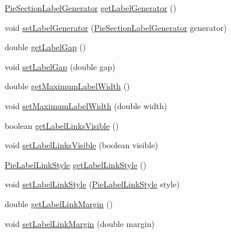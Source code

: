 \begin{DoxyCompactItemize}
\item 
\mbox{\hyperlink{interfaceorg_1_1jfree_1_1chart_1_1labels_1_1_pie_section_label_generator}{Pie\+Section\+Label\+Generator}} \mbox{\hyperlink{classorg_1_1jfree_1_1chart_1_1plot_1_1_pie_plot_a4468c4b622678866bd5fc13c1c2bca50}{get\+Label\+Generator}} ()
\item 
void \mbox{\hyperlink{classorg_1_1jfree_1_1chart_1_1plot_1_1_pie_plot_accf30f5f996861a0ec3ec133a3577ce3}{set\+Label\+Generator}} (\mbox{\hyperlink{interfaceorg_1_1jfree_1_1chart_1_1labels_1_1_pie_section_label_generator}{Pie\+Section\+Label\+Generator}} generator)
\item 
double \mbox{\hyperlink{classorg_1_1jfree_1_1chart_1_1plot_1_1_pie_plot_a7c95a8a80e5f60f48f991a482bf67733}{get\+Label\+Gap}} ()
\item 
void \mbox{\hyperlink{classorg_1_1jfree_1_1chart_1_1plot_1_1_pie_plot_a0478fb7b65d5556cb402dac28991c88b}{set\+Label\+Gap}} (double gap)
\item 
double \mbox{\hyperlink{classorg_1_1jfree_1_1chart_1_1plot_1_1_pie_plot_a07464db0f32860f10894704d8134fa8b}{get\+Maximum\+Label\+Width}} ()
\item 
void \mbox{\hyperlink{classorg_1_1jfree_1_1chart_1_1plot_1_1_pie_plot_abf190f2dce528ec30e486a75e27c3f5e}{set\+Maximum\+Label\+Width}} (double width)
\item 
boolean \mbox{\hyperlink{classorg_1_1jfree_1_1chart_1_1plot_1_1_pie_plot_a61d0861c1429acfa06aa1e7a03fb877c}{get\+Label\+Links\+Visible}} ()
\item 
void \mbox{\hyperlink{classorg_1_1jfree_1_1chart_1_1plot_1_1_pie_plot_aaf3586d5289e6bfd971a484dde785303}{set\+Label\+Links\+Visible}} (boolean visible)
\item 
\mbox{\hyperlink{classorg_1_1jfree_1_1chart_1_1plot_1_1_pie_label_link_style}{Pie\+Label\+Link\+Style}} \mbox{\hyperlink{classorg_1_1jfree_1_1chart_1_1plot_1_1_pie_plot_a242faf0d00119da23a81e76be5dfda47}{get\+Label\+Link\+Style}} ()
\item 
void \mbox{\hyperlink{classorg_1_1jfree_1_1chart_1_1plot_1_1_pie_plot_af484541c4d3e06c2956dd06f7e39caa2}{set\+Label\+Link\+Style}} (\mbox{\hyperlink{classorg_1_1jfree_1_1chart_1_1plot_1_1_pie_label_link_style}{Pie\+Label\+Link\+Style}} style)
\item 
double \mbox{\hyperlink{classorg_1_1jfree_1_1chart_1_1plot_1_1_pie_plot_a94034ed3c2584aba485d418db6217ac9}{get\+Label\+Link\+Margin}} ()
\item 
void \mbox{\hyperlink{classorg_1_1jfree_1_1chart_1_1plot_1_1_pie_plot_a62c82b17fba28898ef0109e07774443a}{set\+Label\+Link\+Margin}} (double margin)

\end{DoxyCompactItemize}
